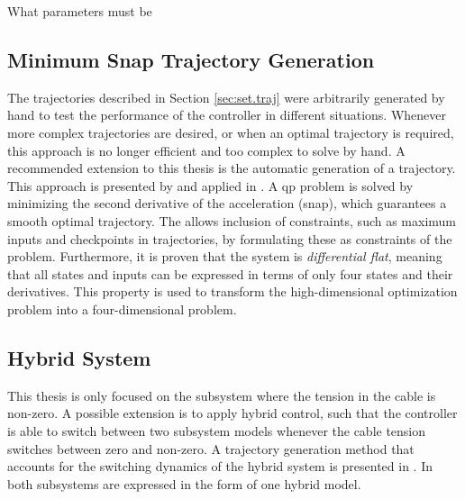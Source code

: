 What parameters must be 





\subsection{Minimum Snap Trajectory Generation}
The trajectories described in Section \ref{sec:set.traj} were arbitrarily generated by hand to test the performance of the controller in different situations. 
Whenever more complex trajectories are desired, or when an optimal trajectory is required, this approach is no longer efficient and too complex to solve by hand.
A recommended extension to this thesis is the automatic generation of a trajectory. 
This approach is presented by \cite{Mellinger2011} and applied in \cite{Tang2014,Tang2015}. A \acs{qp} problem is solved by minimizing the second derivative of the acceleration (snap), which guarantees a smooth optimal trajectory. The  allows inclusion of constraints, such as maximum inputs and checkpoints in trajectories, by formulating these as constraints of the  problem. Furthermore, it is proven that the system is \textit{differential flat}, meaning that all states and inputs can be expressed in terms of only four states and their derivatives. This property is used to transform the high-dimensional optimization problem into a four-dimensional problem.

\subsection{Hybrid System}
This thesis is only focused on the subsystem where the tension in the cable is non-zero. A possible extension is to apply hybrid control, such that the controller is able to switch between two subsystem models whenever the cable tension switches between zero and non-zero. A trajectory generation method that accounts for the switching dynamics of the hybrid system is presented in \cite{Tang2014}. In \cite{Sreenath2013c,Tang2014,Tang2015} both subsystems are expressed in the form of one hybrid model. 